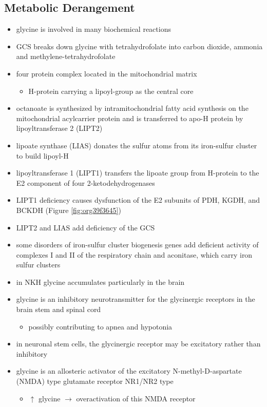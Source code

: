 \documentclass[12pt]{scrartcl}
\begin{document}
\begin{center}
\begin{center}
\subsection{Metabolic Derangement}
\label{sec:org8fa8f7b}
\begin{itemize}
\item glycine is involved in many biochemical reactions
\item GCS breaks down glycine with tetrahydrofolate into carbon dioxide,
ammonia and methylene-tetrahydrofolate
\item four protein complex located in the mitochondrial matrix
\begin{itemize}
\item H-protein carrying a lipoyl-group as the central core
\end{itemize}
\item octanoate is synthesized by intramitochondrial fatty acid synthesis
on the mitochondrial acylcarrier protein and is transferred to apo-H
protein by lipoyltransferase 2 (LIPT2)
\item lipoate synthase (LIAS) donates the sulfur atoms from its
iron-sulfur cluster to build lipoyl-H
\item lipoyltransferase 1 (LIPT1) transfers the lipoate group from
H-protein to the E2 component of four 2-ketodehydrogenases
\item LIPT1 deficiency causes dysfunction of the E2 subunits of PDH, KGDH,
and BCKDH (Figure \ref{fig:org39f3645})
\item LIPT2 and LIAS add deficiency of the GCS
\item some disorders of iron-sulfur cluster biogenesis genes add deficient
activity of complexes I and II of the respiratory chain and
aconitase, which carry iron sulfur clusters
\item in NKH glycine accumulates particularly in the brain
\item glycine is an inhibitory neurotransmitter for the glycinergic
receptors in the brain stem and spinal cord
\begin{itemize}
\item possibly contributing to apnea and hypotonia
\end{itemize}
\item in neuronal stem cells, the glycinergic receptor may be excitatory
rather than inhibitory
\item glycine is an allosteric activator of the excitatory
N-methyl-D-aspartate (NMDA) type glutamate receptor NR1/NR2 type
\begin{itemize}
\item \(\uparrow\) glycine \(\to\) overactivation of this NMDA receptor
\end{itemize}
\end{itemize}

\end{center}
\end{center}
\end{document}
